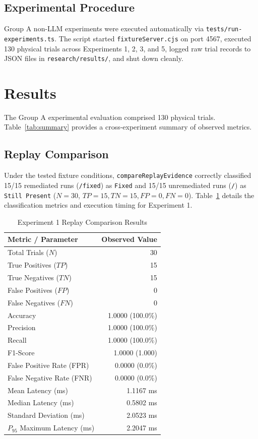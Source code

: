 \documentclass[conference]{IEEEtran}
\begin{document}
\subsection{Experimental Procedure}
Group A non-LLM experiments were executed automatically via \texttt{tests/run-experiments.ts}. The script started \texttt{fixtureServer.cjs} on port 4567, executed 130 physical trials across Experiments 1, 2, 3, and 5, logged raw trial records to JSON files in \texttt{research/results/}, and shut down cleanly.

\section{Results}

The Group A experimental evaluation comprised 130 physical trials. Table~\ref{tab:summary} provides a cross-experiment summary of observed metrics.

\subsection{Replay Comparison}
Under the tested fixture conditions, \texttt{compareReplayEvidence} correctly classified 15/15 remediated runs (\texttt{/fixed}) as \texttt{Fixed} and 15/15 unremediated runs (\texttt{/}) as \texttt{Still Present} ($N=30$, $TP=15, TN=15, FP=0, FN=0$). Table~\ref{tab:exp1} details the classification metrics and execution timing for Experiment 1.

\begin{table}[t]
\caption{Experiment 1 Replay Comparison Results}
\label{tab:exp1}
\centering
\begin{tabular}{l r}
\toprule
\textbf{Metric / Parameter} & \textbf{Observed Value} \\
\midrule
Total Trials ($N$) & 30 \\
True Positives ($TP$) & 15 \\
True Negatives ($TN$) & 15 \\
False Positives ($FP$) & 0 \\
False Negatives ($FN$) & 0 \\
Accuracy & 1.0000 (100.0\%) \\
Precision & 1.0000 (100.0\%) \\
Recall & 1.0000 (100.0\%) \\
F1-Score & 1.0000 (1.000) \\
False Positive Rate (FPR) & 0.0000 (0.0\%) \\
False Negative Rate (FNR) & 0.0000 (0.0\%) \\
Mean Latency (ms) & 1.1167 ms \\
Median Latency (ms) & 0.5802 ms \\
Standard Deviation (ms) & 2.0523 ms \\
$P_{95}$ Maximum Latency (ms) & 2.2047 ms \\
\bottomrule
\end{tabular}
\end{table}
\end{document}
